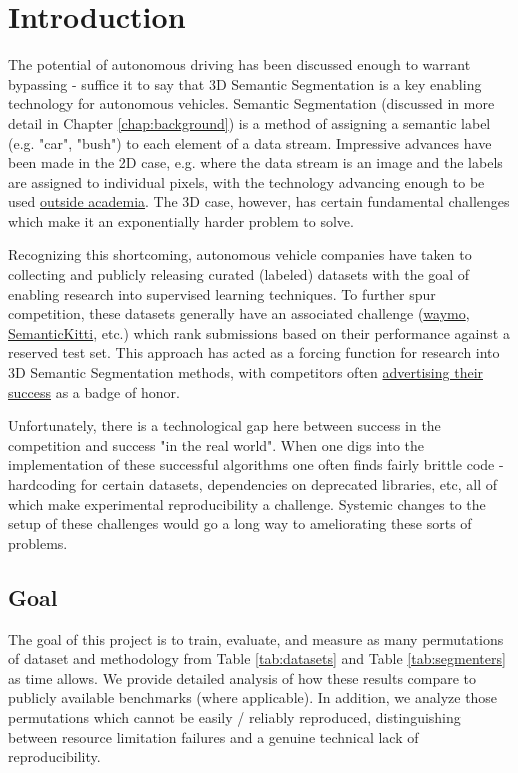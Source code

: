 \section{Introduction}
\label{chap:introduction}

The potential of autonomous driving has been discussed enough to warrant bypassing - suffice it to say that 3D Semantic Segmentation is a key enabling technology for autonomous vehicles. Semantic Segmentation (discussed in more detail in Chapter \ref{chap:background}) is a method of assigning a semantic label (e.g. "car", "bush") to each element of a data stream. Impressive advances have been made in the 2D case, e.g. where the data stream is an image and the labels are assigned to individual pixels, with the technology advancing enough to be used \href{https://nanonets.com/blog/semantic-image-segmentation-2020/}{outside academia}. The 3D case, however, has certain fundamental challenges which make it an exponentially harder problem to solve.

Recognizing this shortcoming, autonomous vehicle companies have taken to collecting and publicly releasing curated (labeled) datasets with the goal of enabling research into supervised learning techniques. To further spur competition, these datasets generally have an associated challenge (\href{https://waymo.com/open/challenges/}{waymo}, \href{https://codalab.lisn.upsaclay.fr/competitions/6280}{SemanticKitti}, etc.) which rank submissions based on their performance against a reserved test set. This approach has acted as a forcing function for research into 3D Semantic Segmentation methods, with competitors often \href{https://github.com/xinge008/Cylinder3D}{advertising their success} as a badge of honor.

Unfortunately, there is a technological gap here between success in the competition and success "in the real world". When one digs into the implementation of these successful algorithms one often finds fairly brittle code - hardcoding for certain datasets, dependencies on deprecated libraries, etc, all of which make experimental reproducibility a challenge. Systemic changes to the setup of these challenges would go a long way to ameliorating these sorts of problems.

\subsection{Goal}
\label{sec:goal}

The goal of this project is to train, evaluate, and measure as many permutations of dataset and methodology from Table \ref{tab:datasets} and Table \ref{tab:segmenters} as time allows. We provide detailed analysis of how these results compare to publicly available benchmarks (where applicable). In addition, we analyze those permutations which cannot be easily / reliably reproduced, distinguishing between resource limitation failures and a genuine technical lack of reproducibility.

